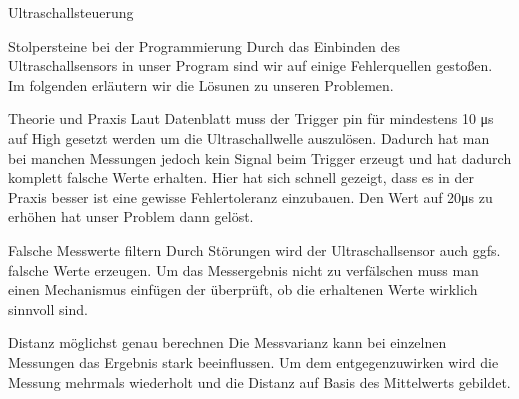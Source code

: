 \documentclass[12pt]{report}
\begin{document}
\begin{section}{Ultraschallsteuerung}
    \begin{subsection}{Stolpersteine bei der Programmierung}
        Durch das Einbinden des Ultraschallsensors in unser Program sind wir auf
        einige Fehlerquellen gestoßen. Im folgenden erläutern wir die Lösunen zu
        unseren Problemen.
        \begin{paragraphwithnewline}{Theorie und Praxis}
            Laut Datenblatt muss der Trigger pin für mindestens 10 \si{\micro\second}
            auf High gesetzt werden um die Ultraschallwelle auszulösen. Dadurch
            hat man bei manchen Messungen jedoch kein Signal beim Trigger erzeugt
            und hat dadurch komplett falsche Werte erhalten. Hier hat sich
            schnell gezeigt, dass es in der Praxis besser ist eine gewisse Fehlertoleranz
            einzubauen. Den Wert auf 20\si{\micro\second} zu erhöhen hat unser
            Problem dann gelöst.
        \end{paragraphwithnewline}

        \begin{paragraphwithnewline}{Falsche Messwerte filtern}
            Durch Störungen wird der Ultraschallsensor auch ggfs. falsche Werte
            erzeugen. Um das Messergebnis nicht zu verfälschen muss man einen
            Mechanismus einfügen der überprüft, ob die erhaltenen Werte wirklich
            sinnvoll sind. 
        \end{paragraphwithnewline}

        \begin{paragraphwithnewline}{Distanz möglichst genau berechnen}
            Die Messvarianz kann bei einzelnen Messungen das Ergebnis stark
            beeinflussen. Um dem entgegenzuwirken wird die Messung mehrmals
            wiederholt und die Distanz auf Basis des Mittelwerts gebildet.
        \end{paragraphwithnewline}


\end{subsection}
\end{section}
\end{document}

